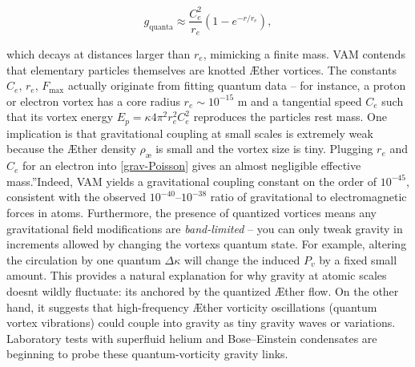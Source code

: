 \begin{equation}
    g_\text{quanta} \approx \frac{C_e^2}{r_e} \left(1 - e^{-r/r_e} \right),
    \label{eq:g_quanta}
\end{equation}

which decays at distances larger than $r_e$, mimicking a finite mass.
VAM contends that elementary particles themselves are knotted Æther vortices. The constants $C_e$, $r_e$, $F_{\max}$ actually originate from fitting quantum data – for instance, a proton or electron vortex has a core radius $r_e \sim 10^{-15}$ m and a tangential speed $C_e$ such that its vortex energy $E_p = \kappa 4\pi^2 r_e^2 C_e^2$ reproduces the particle\rqs s rest mass. One implication is that gravitational coupling at small scales is extremely weak because the Æther density $\rho_\text{\ae}$ is small and the vortex size is tiny. Plugging $r_e$ and $C_e$ for an electron into \eqref{grav-Poisson} gives an almost negligible effective \grqq mass.\textquotedblright Indeed, VAM yields a gravitational coupling constant on the order of $10^{-45}$, consistent with the observed $10^{-40}$–$10^{-38}$ ratio of gravitational to electromagnetic forces in atoms. Furthermore, the presence of quantized vortices means any gravitational field modifications are \textit{band-limited} – you can only tweak gravity in increments allowed by changing the vortex\rqs s quantum state. For example, altering the circulation by one quantum $\Delta \kappa$ will change the induced $P_v$ by a fixed small amount. This provides a natural explanation for why gravity at atomic scales doesn\rqs t wildly fluctuate: it\rqs s anchored by the quantized Æther flow. On the other hand, it suggests that high-frequency Æther vorticity oscillations (quantum vortex vibrations) could couple into gravity as tiny gravity waves or variations. Laboratory tests with superfluid helium and Bose–Einstein condensates are beginning to probe these quantum-vorticity gravity links.

